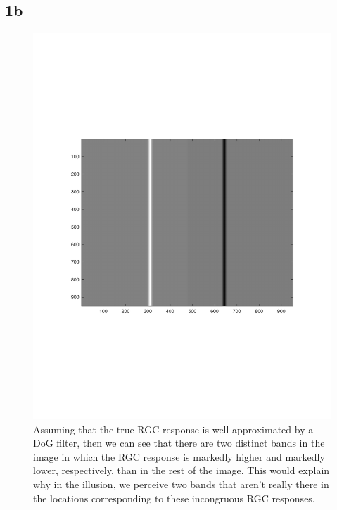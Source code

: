 \documentclass[]{article}
\begin{document}
\subsection*{1b}
\begin{figure}[H]
    \centering
    \includegraphics[width=0.7\linewidth]{problem1B.pdf}
    \caption{Assuming that the true RGC response is well approximated by a DoG filter, then we can see that there are two distinct bands in the image in which the RGC response is markedly higher and markedly lower, respectively, than in the rest of the image. This would explain why in the illusion, we perceive two bands that aren't really there in the locations corresponding to these incongruous RGC responses.}
    \label{fig:my_label}
\end{figure}
\end{document}
